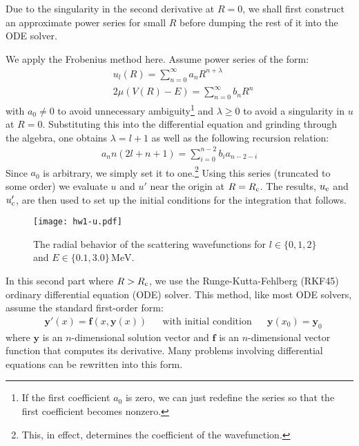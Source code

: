 \documentclass[fleqn, 12pt]{article}
\begin{document}
\begin{enumerate}
  Due to the singularity in the second derivative at $R = 0$, we shall first
  construct an approximate power series for small $R$ before dumping the rest
  of it into the ODE solver.

  We apply the Frobenius method here.  Assume power series of the form:
  \begin{align*}
    &u_l(R) = \sum_{n = 0}^\infty a_n R^{n + \lambda} \\
    &2 \mu (V(R) - E) = \sum_{n = 0}^\infty b_n R^n
  \end{align*}
  with $a_0 \ne 0$ to avoid unnecessary ambiguity\footnote{If the first
    coefficient $a_0$ is zero, we can just redefine the series so that the
    first coefficient becomes nonzero.}  and $\lambda \ge 0$ to avoid a
  singularity in $u$ at $R = 0$.  Substituting this into the differential
  equation and grinding through the algebra, one obtains $\lambda = l + 1$ as
  well as the following recursion relation:
  \begin{align*}
    a_n n (2 l + n + 1) = \sum_{i = 0}^{n - 2} b_i a_{n - 2 - i}
  \end{align*}
  Since $a_0$ is arbitrary, we simply set it to one.\footnote{This, in effect,
    determines the coefficient of the wavefunction.}  Using this series
  (truncated to some order) we evaluate $u$ and $u'$ near the origin at
  $R = R_{\text c}$.  The results, $u_{\text c}$ and $u'_{\text c}$, are then
  used to set up the initial conditions for the integration that follows.

  \begin{figure}
    \centering
    \texttt{[image: hw1-u.pdf]}
    \caption{The radial behavior of the scattering wavefunctions for
      $l \in \{0, 1, 2\}$ and $E \in \{0.1, 3.0\} \,\mathrm{MeV}$.}
    \label{fig:wavefunction}
  \end{figure}

  In this second part where $R > R_{\text c}$, we use the Runge-Kutta-Fehlberg
  (RKF45) ordinary differential equation (ODE) solver.  This method, like most
  ODE solvers, assume the standard first-order form:
  \begin{align*}
    &\bm y'(x) = \bm f(x, \bm y(x)) &
    &\text{with initial condition} &
    &\bm y(x_0) = \bm y_0
  \end{align*}
  where $\bm y$ is an $n$-dimensional solution vector and $\bm f$ is an
  $n$-dimensional vector function that computes its derivative.  Many problems
  involving differential equations can be rewritten into this form.


\end{enumerate}
\end{document}
